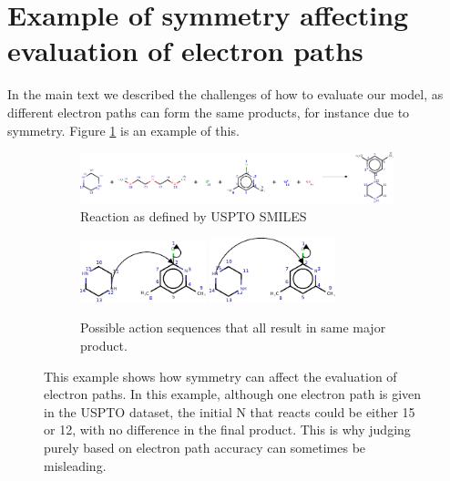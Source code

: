 \section{Example of symmetry affecting evaluation of electron paths}
In the main text we described the challenges of how to evaluate our model, as different electron paths can form the same products, for instance due to symmetry.
Figure \ref{fig:symmetric-reaction-example} is an example of this.


\begin{figure}[h]

    \centering
    \begin{subfigure}[b]{0.95\textwidth}
        \centering
        \includegraphics[width=\textwidth]{imgs/symmetry/main_reaction}
        \caption{Reaction as defined by USPTO SMILES}
    \end{subfigure}
    
    \par\bigskip %
    \begin{subfigure}[b]{0.95\textwidth}
        \centering
        \includegraphics[width=0.4\textwidth]{imgs/symmetry/possible1}
        \qquad
        \qquad
        \includegraphics[width=0.4\textwidth]{imgs/symmetry/possible2}
        \caption{Possible action sequences that all result in same major product.}
    \end{subfigure}
    \caption{This example shows how symmetry can affect the evaluation of electron paths. In this example, although one electron path is given in the USPTO dataset, the initial N that reacts could be either 15 or 12, with no difference in the final product. This is why judging purely based on electron path accuracy can sometimes be misleading.}
    \label{fig:symmetric-reaction-example}
\end{figure}

